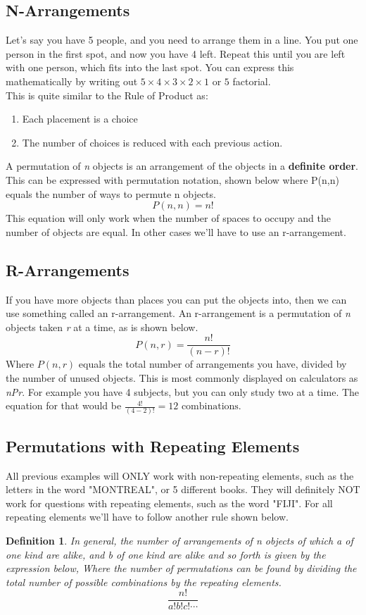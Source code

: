 \documentclass[final,1p,12pt]{elsarticle}
\newtheorem{definition}{Definition}
\begin{document}
    \subsection{N-Arrangements}
    Let's say you have 5 people, and you need to arrange them in a line.
    You put one person in the first spot, and now you have 4 left. Repeat this until you are left with one person, which fits into the last spot. You can express this mathematically by writing out $5\times4\times3\times2\times1$ or $5$ factorial.\\
    This is quite similar to the Rule of Product as:
    \begin{enumerate}
        \item Each placement is a choice
        \item The number of choices is reduced with each previous action. 
    \end{enumerate}
    A permutation of \emph{n} objects is an arrangement of the objects in a \textbf{definite order}. This can be expressed with permutation notation, shown below where P(n,n) equals the number of ways to permute n objects.
    \[P(n,n) = n!\]
    This equation will only work when the number of spaces to occupy and the number of objects are equal. In other cases we'll have to use an r-arrangement.
    
    \subsection{R-Arrangements}
    If you have more objects than places you can put the objects into, then we can use something called an r-arrangement. An r-arrangement is a permutation of \emph{n} objects taken \emph{r} at a time, as is shown below.
    \[P(n,r) = \frac{n!}{(n-r)!}\]
    Where $P(n,r)$ equals the total number of arrangements you have, divided by the number of unused objects. This is most commonly displayed on calculators as \emph{nPr}. For example you have 4 subjects, but you can only study two at a time. The equation for that would be $\frac{4!}{(4-2)!}=12\mbox{ combinations.}$ 
    \clearpage
    
    \subsection{Permutations with Repeating Elements}
    All previous examples will ONLY work with non-repeating elements, such as the letters in the word "MONTREAL", or 5 different books. They will definitely NOT work for questions with repeating elements, such as the word "FIJI". For all repeating elements we'll have to follow another rule shown below.
    \begin{definition}
        In general, the number of arrangements of \emph{n} objects of which \emph{a} of one kind are alike, and \emph{b} of one kind are alike and so forth is given by the expression below, Where the number of permutations can be found by dividing the total number of possible combinations by the repeating elements.   \[\frac{n!}{a!b!c!\cdots}\]
    \end{definition}
    
\end{document}
